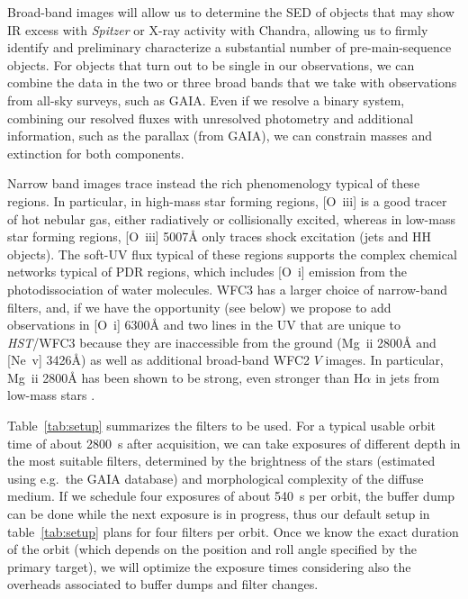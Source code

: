 \documentclass[12pt]{article}
\begin{document}
Broad-band images will allow us to determine the SED of objects that may show IR excess with \emph{Spitzer} or X-ray activity with Chandra, allowing us to firmly identify and preliminary characterize a substantial number of pre-main-sequence objects. For objects that turn out to be single in our observations, we can combine the data in the two or three broad bands that we take with observations from all-sky surveys, such as GAIA. Even if we resolve a binary system, combining our resolved fluxes with unresolved photometry and additional information, such as the parallax (from GAIA), we can constrain masses and extinction for both components.

Narrow band images trace instead the rich phenomenology typical of these regions. In particular, in 
high-mass star forming regions, [O~{\sc iii}] is a good tracer of hot nebular gas, either radiatively or collisionally excited, whereas in low-mass star forming regions, [O~{\sc iii}] 5007\AA{} only traces shock excitation (jets and HH objects). The soft-UV flux typical of these regions supports the complex chemical networks typical of PDR regions, which includes [O~{\sc i}] emission from the photodissociation of water molecules. WFC3 has a larger choice of narrow-band filters, and, if we have the opportunity (see below) we propose to add observations in [O~{\sc i}] 6300\AA{} and two lines in the UV that are unique to \emph{HST}/WFC3 because they are inaccessible from the ground (Mg~{\sc ii} 2800\AA{} and [Ne~{\sc v}] 3426\AA{}) as well as additional broad-band WFC2 $V$ images. In particular, Mg~{\sc ii} 2800\AA{} has been shown to be strong, even stronger than H$\alpha$ in jets from low-mass stars \citep{2007ApJ...663..350C}.

 Table~\ref{tab:setup} summarizes the filters to be used.
For a typical usable orbit time of about 2800~s after acquisition, we can take exposures of different depth in the most suitable filters, determined by the brightness of the stars (estimated using e.g.\ the GAIA database) and morphological complexity of the diffuse medium. If we schedule four exposures of about 540~s per orbit, the buffer dump can be done while the next exposure is in progress, thus our default setup in table~\ref{tab:setup} plans for four filters per orbit. 
Once we know the exact duration of the orbit (which depends on the position and roll angle specified by the primary target), we will optimize the exposure times considering also the overheads associated to buffer dumps and filter changes.
\end{document}
